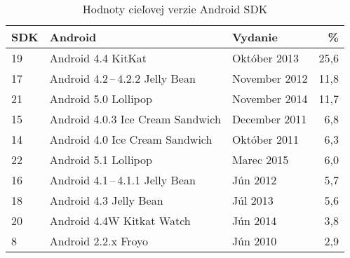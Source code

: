 \begin{table}[H]
\centering
  \begin{tabular}{|l l l r|}
    \hline
    \textbf{SDK} & \textbf{Android} & \textbf{Vydanie}& \textbf{\%} \\\hline\hline
    19 & Android 4.4 KitKat & Október 2013 & 25,6 \\
    17 & Android 4.2\,--\,4.2.2 Jelly Bean & November 2012 & 11,8 \\
    21 & Android 5.0 Lollipop & November 2014 & 11,7 \\
    15 & Android 4.0.3 Ice Cream Sandwich & December 2011 & 6,8 \\
    14 & Android 4.0 Ice Cream Sandwich & Október 2011 & 6,3 \\
    22 & Android 5.1 Lollipop & Marec 2015 & 6,0\\
    16 & Android 4.1\,--\,4.1.1 Jelly Bean & Jún 2012 & 5,7 \\
    18 & Android 4.3 Jelly Bean & Júl 2013 & 5,6 \\
    20 & Android 4.4W Kitkat Watch & Jún 2014 & 3,8 \\
    8 & Android 2.2.x Froyo & Jún 2010& 2,9\\
    \hline
  \end{tabular}
  \caption{Hodnoty cieľovej verzie Android SDK}
  \label{tab:targetSdk}
\end{table}
